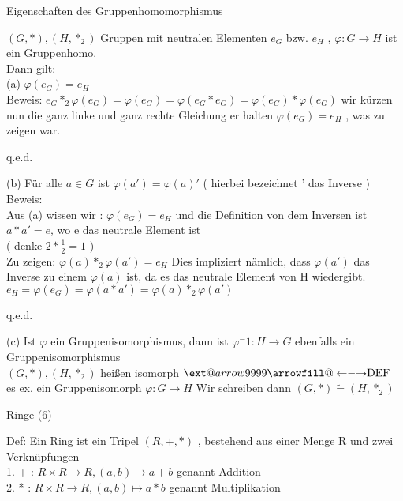 \documentclass[smallheadings,12pt,a4paper]{scrartcl}
\makeatletter
\newcommand\xleftrightarrow[2][]{%
  \ext@arrow 9999{\longleftrightarrowfill@}{#1}{#2}}
\newcommand\longleftrightarrowfill@{%
  \arrowfill@\leftarrow\relbar\rightarrow}
\makeatother
\begin{document}
\begin{center}
\item[Eigenschaften des Gruppenhomomorphismus]
\end{center}
\item $(G,*), (H, *_2) $ Gruppen mit neutralen Elementen $e_G$ bzw. $e_H$ , $ \varphi: G \rightarrow H $ ist ein Gruppenhomo. \\
Dann gilt: \\
(a) $\varphi(e_G)=e_H$ \\
Beweis: $ e_G *_2 \varphi(e_G) = \varphi(e_G) = \varphi(e_G * e_G) = \varphi(e_G) * \varphi(e_G) $ wir kürzen nun die ganz linke und ganz rechte Gleichung er halten $\varphi(e_G)=e_H$ , was zu zeigen war. 
\begin{flushright}
q.e.d.
\end{flushright}
(b) Für alle $ a \in G $ ist $ \varphi(a') = \varphi (a)' $ ( hierbei bezeichnet ' das Inverse )\\
Beweis: \\

Aus (a) wissen wir : $\varphi(e_G)=e_H$ und die Definition von dem Inversen ist $ a * a' = e $, wo e das neutrale Element ist \\
( denke $ 2 * \frac{1}{2} = 1 $ ) \\
Zu zeigen: $\varphi(a) *_2 \varphi(a') = e_H $ Dies impliziert nämlich, dass $\varphi(a')$ das Inverse zu einem $\varphi(a)$ ist, da es das neutrale Element von H wiedergibt. \\
$e_H=\varphi(e_G) = \varphi(a*a') = \varphi(a) *_2 \varphi(a') $ 
\begin{flushright}
q.e.d. \\
\end{flushright}

(c) Ist $\varphi$ ein Gruppenisomorphismus, dann ist $\varphi ^-1 : H \rightarrow G $ ebenfalls ein Gruppenisomorphismus \\
$(G,*), (H, *_2) $ heißen isomorph $ \xleftrightarrow{\text{DEF}} $ es ex. ein Gruppenisomorph
 $ \varphi : G \rightarrow H $ Wir schreiben dann $(G,*) \tilde{=} (H,*_2) $

\begin{center}
\item[Ringe (6) ]
\end{center}
\item Def: Ein Ring ist ein Tripel $(R,+,*)$ , bestehend aus einer Menge R und zwei Verknüpfungen \\
1. + : $ R \times R \rightarrow R , (a,b) \mapsto a+b $ genannt Addition \\
2. * : $ R \times R \rightarrow R , (a,b) \mapsto a*b $ genannt Multiplikation \\
\end{document}
